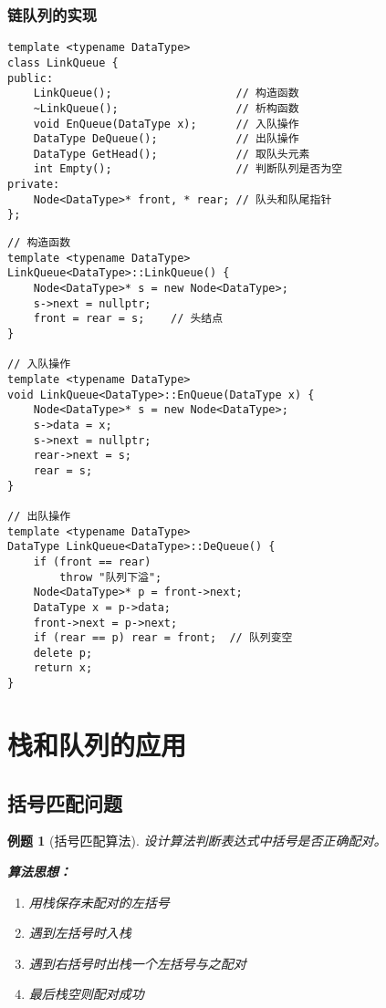 \documentclass[12pt,a4paper]{amsart}
\newtheorem{example}{例题}[section]
\begin{document}
\subsubsection{链队列的实现}

\indent

\begin{lstlisting}[caption=链队列类定义]
template <typename DataType>
class LinkQueue {
public:
    LinkQueue();                   // 构造函数
    ~LinkQueue();                  // 析构函数
    void EnQueue(DataType x);      // 入队操作
    DataType DeQueue();            // 出队操作
    DataType GetHead();            // 取队头元素
    int Empty();                   // 判断队列是否为空
private:
    Node<DataType>* front, * rear; // 队头和队尾指针
};
\end{lstlisting}

\begin{lstlisting}[caption=链队列基本操作]
// 构造函数
template <typename DataType>
LinkQueue<DataType>::LinkQueue() {
    Node<DataType>* s = new Node<DataType>;
    s->next = nullptr;
    front = rear = s;    // 头结点
}

// 入队操作
template <typename DataType>
void LinkQueue<DataType>::EnQueue(DataType x) {
    Node<DataType>* s = new Node<DataType>;
    s->data = x;
    s->next = nullptr;
    rear->next = s;
    rear = s;
}

// 出队操作
template <typename DataType>
DataType LinkQueue<DataType>::DeQueue() {
    if (front == rear) 
        throw "队列下溢";
    Node<DataType>* p = front->next;
    DataType x = p->data;
    front->next = p->next;
    if (rear == p) rear = front;  // 队列变空
    delete p;
    return x;
}
\end{lstlisting}

\section{栈和队列的应用}

\subsection{括号匹配问题}

\begin{example}[括号匹配算法]
设计算法判断表达式中括号是否正确配对。

\textbf{算法思想：}
\begin{enumerate}
\item 用栈保存未配对的左括号
\item 遇到左括号时入栈
\item 遇到右括号时出栈一个左括号与之配对
\item 最后栈空则配对成功
\end{enumerate}
\end{example}
\end{document}
